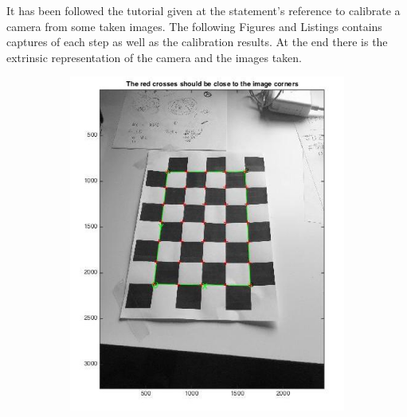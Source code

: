 \documentclass{ethz_report}
\begin{document}
It has been followed the tutorial given at the statement's reference to calibrate a camera from some taken images.
The following Figures and Listings contains captures of each step as well as the calibration results.
At the end there is the extrinsic representation of the camera and the images taken.

\begin{figure}[H]
\centering
\begin{subfigure}[b]{.5\textwidth}
  \centering
  \includegraphics[width=1\linewidth]{images/corner_detection_1}
\end{subfigure}%
\begin{subfigure}[b]{.5\textwidth}
  \centering

\end{subfigure}
\end{figure}
\end{document}
